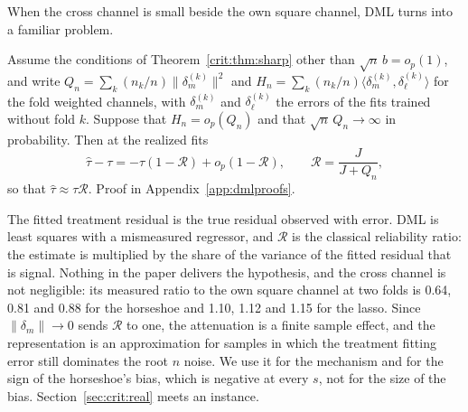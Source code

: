 When the cross channel is small beside the own square channel, DML turns into a familiar problem.

\begin{theorem}\label{crit:thm:atten}
Assume the conditions of Theorem~\ref{crit:thm:sharp} other than $\sqrt n\,b = o_p(1)$, and write $Q_n = \sum_k (n_k/n)\|\delta_m^{(k)}\|^2$ and $H_n = \sum_k (n_k/n)\langle\delta_m^{(k)},\delta_\ell^{(k)}\rangle$ for the fold weighted channels, with $\delta_m^{(k)}$ and $\delta_\ell^{(k)}$ the errors of the fits trained without fold $k$. Suppose that $H_n = o_p(Q_n)$ and that $\sqrt n\,Q_n \to \infty$ in probability. Then at the realized fits
\[
\hat\tau - \tau = -\tau(1 - \mathcal R) + o_p(1 - \mathcal R), \qquad \mathcal R = \frac{J}{J + Q_n},
\]
so that $\hat\tau \approx \tau\mathcal R$. Proof in Appendix~\ref{app:dmlproofs}.
\end{theorem}

The fitted treatment residual is the true residual observed with error. DML is least squares with a mismeasured regressor, and $\mathcal R$ is the classical reliability ratio: the estimate is multiplied by the share of the variance of the fitted residual that is signal. Nothing in the paper delivers the hypothesis, and the cross channel is not negligible: its measured ratio to the own square channel at two folds is 0.64, 0.81 and 0.88 for the horseshoe and 1.10, 1.12 and 1.15 for the lasso. Since $\|\delta_m\| \to 0$ sends $\mathcal R$ to one, the attenuation is a finite sample effect, and the representation is an approximation for samples in which the treatment fitting error still dominates the root $n$ noise. We use it for the mechanism and for the sign of the horseshoe's bias, which is negative at every $s$, not for the size of the bias. Section~\ref{sec:crit:real} meets an instance.

